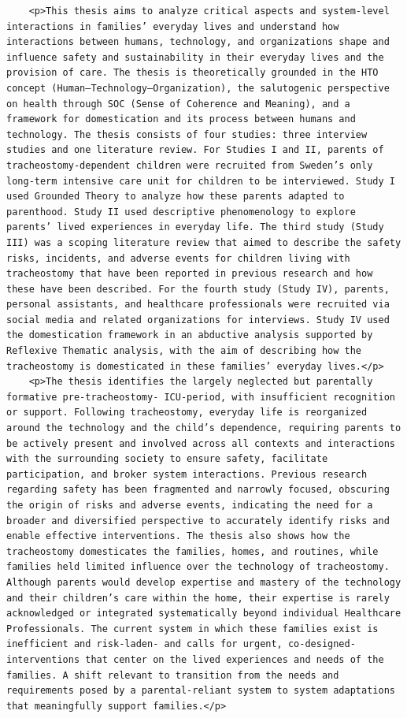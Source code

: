\begin{casestudySection}
\begin{lstlisting}
    <p>This thesis aims to analyze critical aspects and system-level interactions in families’ everyday lives and understand how interactions between humans, technology, and organizations shape and influence safety and sustainability in their everyday lives and the provision of care. The thesis is theoretically grounded in the HTO concept (Human–Technology–Organization), the salutogenic perspective on health through SOC (Sense of Coherence and Meaning), and a framework for domestication and its process between humans and technology. The thesis consists of four studies: three interview studies and one literature review. For Studies I and II, parents of tracheostomy-dependent children were recruited from Sweden’s only long-term intensive care unit for children to be interviewed. Study I used Grounded Theory to analyze how these parents adapted to parenthood. Study II used descriptive phenomenology to explore parents’ lived experiences in everyday life. The third study (Study III) was a scoping literature review that aimed to describe the safety risks, incidents, and adverse events for children living with tracheostomy that have been reported in previous research and how these have been described. For the fourth study (Study IV), parents, personal assistants, and healthcare professionals were recruited via social media and related organizations for interviews. Study IV used the domestication framework in an abductive analysis supported by Reflexive Thematic analysis, with the aim of describing how the tracheostomy is domesticated in these families’ everyday lives.</p>
    <p>The thesis identifies the largely neglected but parentally formative pre-tracheostomy‑ ICU-period, with insufficient recognition or support. Following tracheostomy, everyday life is reorganized around the technology and the child’s dependence, requiring parents to be actively present and involved across all contexts and interactions with the surrounding society to ensure safety, facilitate participation, and broker system interactions. Previous research regarding safety has been fragmented and narrowly focused, obscuring the origin of risks and adverse events, indicating the need for a broader and diversified perspective to accurately identify risks and enable effective interventions. The thesis also shows how the tracheostomy domesticates the families, homes, and routines, while families held limited influence over the technology of tracheostomy. Although parents would develop expertise and mastery of the technology and their children’s care within the home, their expertise is rarely acknowledged or integrated systematically beyond individual Healthcare Professionals. The current system in which these families exist is inefficient and risk-laden‑ and calls for urgent, co-designed‑ interventions that center on the lived experiences and needs of the families. A shift relevant to transition from the needs and requirements posed by a parental-reliant system to system adaptations that meaningfully support families.</p>

\end{lstlisting}
\end{casestudySection}
